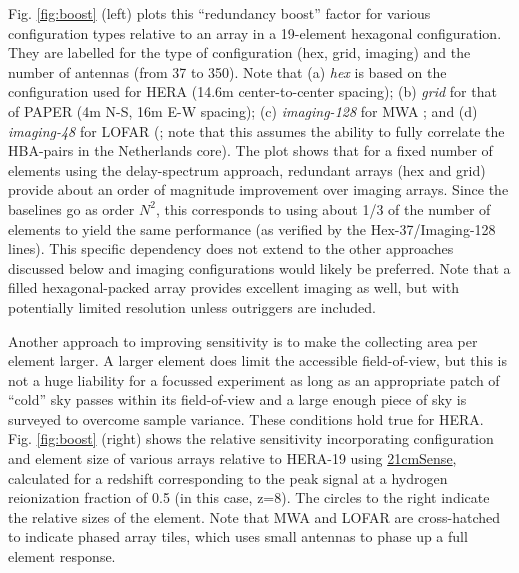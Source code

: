 \documentclass[preprint,11pt]{aastex}
\begin{document}
Fig. \ref{fig:boost} (left) plots this ``redundancy boost'' factor for various configuration types relative to an array in a 19-element hexagonal configuration.  They are labelled for the type of configuration (hex, grid, imaging) and the number of antennas (from 37 to 350).  Note that (a) {\em hex} is based on the configuration used for HERA (14.6m center-to-center spacing); (b) {\em grid} for that of PAPER (4m N-S, 16m E-W spacing); (c) {\em imaging-128} for MWA \citep{tingay_et_al2013}; and (d) {\em imaging-48} for LOFAR (\citealt{2013A&A...556A...2V}; note that this assumes the ability to fully correlate the HBA-pairs in the Netherlands core).  The plot shows that for a fixed number of elements using the delay-spectrum approach, redundant arrays (hex and grid) provide about an order of magnitude improvement over imaging arrays.  Since the baselines go as order $N^2$, this corresponds to using about 1/3 of the number of elements to yield the same performance (as verified by the Hex-37/Imaging-128 lines).  This specific dependency does not extend to the other approaches discussed below and imaging configurations would likely be preferred.  Note that a filled hexagonal-packed array provides excellent imaging as well, but with potentially limited resolution unless outriggers are included.

Another approach to improving sensitivity is to make the collecting area per element larger.  A larger element does limit the accessible field-of-view, but this is not a huge liability for a focussed experiment as long as an appropriate patch of ``cold'' sky passes within its field-of-view and a large enough piece of sky is surveyed to overcome sample variance.  These conditions hold true for HERA.  Fig. \ref{fig:boost} (right) shows the relative sensitivity incorporating configuration and element size of various arrays relative to HERA-19 using \url{21cmSense}, calculated for a redshift corresponding to the peak signal at a hydrogen reionization fraction of 0.5 (in this case, z=8).  The circles to the right indicate the relative sizes of the element.  Note that MWA and LOFAR are cross-hatched to indicate phased array tiles, which uses small antennas to phase up a full element response.
\end{document}
